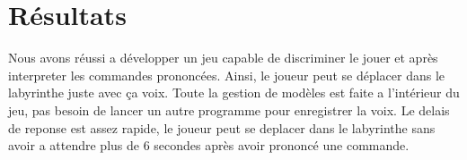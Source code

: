 \section{Résultats}
\label{sec:resultats}

Nous avons réussi a développer un jeu capable de discriminer le jouer et après interpreter les commandes prononcées.
Ainsi, le joueur peut se déplacer dans le labyrinthe juste avec ça voix. Toute la gestion de modèles est faite a l'intérieur du jeu, pas
besoin de lancer un autre programme pour enregistrer la voix. Le delais de reponse est assez rapide, le joueur peut se deplacer
dans le labyrinthe sans avoir a attendre plus de 6 secondes après avoir prononcé une commande.

